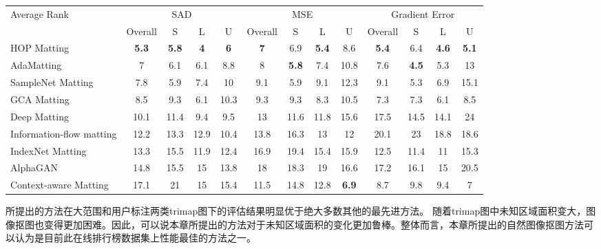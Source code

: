 \begin{table}[t]
\footnotesize
\centering
\begin{tabular}{@{\;\;}l|@{\;\;}c@{\;\;}|@{\;\;}c@{\;\;}c@{\;\;}c@{\;\;}|@{\;\;}c@{\;\;}|@{\;\;}c@{\;\;}c@{\;\;}c@{\;\;}|@{\;\;}c@{\;\;}|@{\;\;}c@{\;\;}c@{\;\;}c@{\;\;}}
	\toprule
	\multirow{2}{*}{Average Rank} & \multicolumn{4}{c|}{SAD}& \multicolumn{4}{c|}{MSE}& \multicolumn{4}{c}{Gradient Error}\\
	& Overall&S&L&U& Overall&S&L&U& Overall&S&L&U\\
	\midrule
	HOP Matting&	\textbf{5.3}&	\textbf{5.8}	&\textbf{4}&	\textbf{6}&	\textbf{7}&	6.9&\textbf{5.4}	&8.6&\textbf{5.4}	&6.4&	\textbf{4.6}&	\textbf{5.1} \\		
	AdaMatting\cite{cai2019disentangled} &7&	6.1	&6.1&	8.8 &8&	\textbf{5.8}	&7.4&	10.8&7.6&	\textbf{4.5}&	5.3&	13\\		
	SampleNet Matting\cite{samplenet} &	7.8&5.9&	7.4&	10 &	9.1	&5.9&	9.1	&12.3&	9.1	&5.3&	6.9	&15.1\\		
	GCA Matting	&8.5&	9.3	&6.1&	10.3&9.3	&9.3&	8.3	&10.5&7.3&	7.3&	6.1&	8.5	 \\		
	Deep Matting\cite{xu2017deep}&10.1&	11.4&	9.4	&9.5&13	&11.6&	11.8&	15.6	&17.5&	14.5&	14.1&	24\\		
	Information-flow matting \cite{aksoy2017designing}&12.2&	13.3&	12.9&	10.4&13.8&	16.3&	13&	12&	20.1&	23	&18.8&	18.6\\		
	IndexNet Matting\cite{lu2019indices}&13.3&	15.5&	11.9&	12.4	&16.9&	19.4&	15.4&	15.9	&12.5&	11.4&	11&	15.3	\\		
	AlphaGAN\cite{cai2019disentangled}&14.8&	15.5&	15&	13.8&18&	18.3&	19&	16.6&17.2&	16.1&	15&	20.5\\
	Context-aware Matting\cite{hou2019context}&	17.1&	21&	15&	15.4&11.5&	14.8&	12.8	&\textbf{6.9}&8.7&	9.8&	9.4	&7	\\	
	\bottomrule
\end{tabular}
\label{tab5:alphamatting}
\end{table}


所提出的方法在大范围和用户标注两类trimap图下的评估结果明显优于绝大多数其他的最先进方法。 随着trimap图中未知区域面积变大，图像抠图也变得更加困难。因此，可以说本章所提出的方法对于未知区域面积的变化更加鲁棒。整体而言，本章所提出的自然图像抠图方法可以认为是目前此在线排行榜数据集上性能最佳的方法之一。

